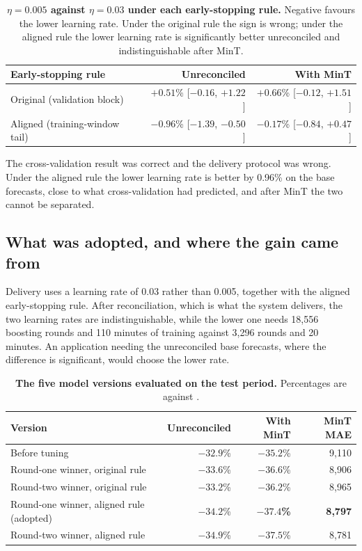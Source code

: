 \begin{table}[htp]
\centering
\begin{tabular}{lrr}
\toprule
{\bf Early-stopping rule} & {\bf Unreconciled} & {\bf With MinT} \\
\midrule
Original (validation block) & $+0.51$\% [$-0.16$, $+1.22$] & $+0.66$\% [$-0.12$, $+1.51$] \\
Aligned (training-window tail) & $-0.96$\% [$-1.39$, $-0.50$] & $-0.17$\% [$-0.84$, $+0.47$] \\
\bottomrule
\end{tabular}
\caption[Learning rate under each rule]{\textbf{$\eta = 0.005$ against $\eta = 0.03$ under
each early-stopping rule.} Negative favours the lower learning rate. Under the original rule
the sign is wrong; under the aligned rule the lower learning rate is significantly better
unreconciled and indistinguishable after MinT.}
\label{tab:lrflip}
\end{table}

The cross-validation result was correct and the delivery protocol was wrong. Under the
aligned rule the lower learning rate is better by 0.96\% on the base forecasts, close to
what cross-validation had predicted, and after MinT the two cannot be separated.

\subsection{What was adopted, and where the gain came from}

Delivery uses a learning rate of 0.03 rather than 0.005, together with the aligned
early-stopping rule. After reconciliation, which is what the system delivers, the two
learning rates are indistinguishable, while the lower one needs 18,556 boosting rounds and
110 minutes of training against 3,296 rounds and 20 minutes. An application needing the
unreconciled base forecasts, where the difference is significant, would choose the lower
rate.

\begin{table}[htp]
\centering
\begin{tabular}{lrrr}
\toprule
{\bf Version} & {\bf Unreconciled} & {\bf With MinT} & {\bf MinT MAE} \\
\midrule
Before tuning & $-32.9$\% & $-35.2$\% & 9,110 \\
Round-one winner, original rule & $-33.6$\% & $-36.6$\% & 8,906 \\
Round-two winner, original rule & $-33.2$\% & $-36.2$\% & 8,965 \\
Round-one winner, aligned rule (adopted) & $-34.2$\% & {\bf $-37.4$\%} & {\bf 8,797} \\
Round-two winner, aligned rule & $-34.9$\% & $-37.5$\% & 8,781 \\
\bottomrule
\end{tabular}
\caption[Tuning summary]{\textbf{The five model versions evaluated on the test period.}
Percentages are against \naiveA{}.}
\label{tab:tunesummary}
\end{table}

